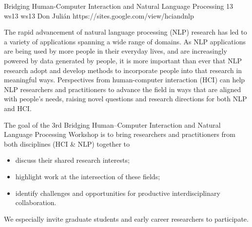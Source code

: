\begin{wsschedulenolist}
{Bridging Human-Computer Interaction and Natural Language Processing}
{13}
{ws13}
{ws13}
{Don Juli\'an}
{https://sites.google.com/view/hciandnlp}

The rapid advancement of natural language processing (NLP) research has led to a variety of applications spanning a wide range of domains. As NLP applications are being used by more people in their everyday lives, and are increasingly powered by data generated by people, it is more important than ever that NLP research adopt and develop methods to incorporate people into that research in meaningful ways. Perspectives from human-computer interaction (HCI) can help NLP researchers and practitioners to advance the field in ways that are aligned with people's needs, raising novel questions and research directions for both NLP and HCI.

The goal of the 3rd Bridging Human--Computer Interaction and Natural Language Processing Workshop is to bring researchers and practitioners from both disciplines (HCI \& NLP) together to

\begin{itemize}
    \item discuss their shared research interests;
    \item highlight work at the intersection of these fields;
    \item identify challenges and opportunities for productive interdisciplinary collaboration.
\end{itemize}

We especially invite graduate students and early career researchers to participate.

\end{wsschedulenolist}
